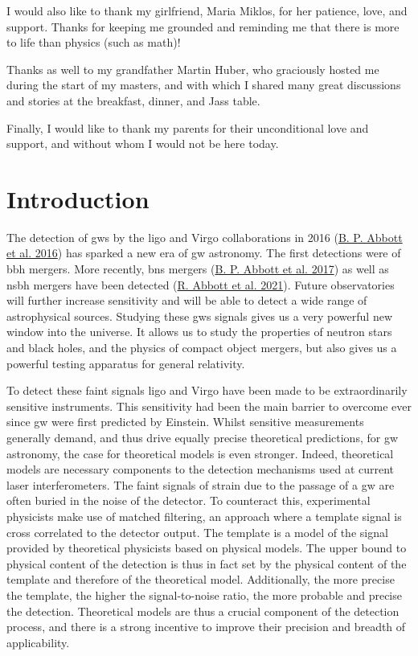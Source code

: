 \documentclass[
  11pt,
  a4paper,
  DIV=11,
  numbers=noendperiod,
  oneside]{scrreprt}
\DeclareRobustCommand{\[}{\begin{equation}}
\DeclareRobustCommand{\]}{\end{equation}}
\begin{document}
I would also like to thank my girlfriend, Maria Miklos, for her
patience, love, and support. Thanks for keeping me grounded and
reminding me that there is more to life than physics (such as math)!

Thanks as well to my grandfather Martin Huber, who graciously hosted me
during the start of my masters, and with which I shared many great
discussions and stories at the breakfast, dinner, and Jass table.

Finally, I would like to thank my parents for their unconditional love
and support, and without whom I would not be here today.


\hypertarget{sec-intro}{%
\chapter{Introduction}\label{sec-intro}}

The detection of \glspl{gw} by the \gls{ligo} and Virgo collaborations
in 2016 (\protect\hyperlink{ref-LIGOScientific:2016aoc}{B. P. Abbott et
al. 2016}) has sparked a new era of \gls{gw} astronomy. The first
detections were of \gls{bbh} mergers. More recently, \gls{bns} mergers
(\protect\hyperlink{ref-LIGOScientific:2017vwq}{B. P. Abbott et al.
2017}) as well as \gls{nsbh} mergers have been detected
(\protect\hyperlink{ref-LIGOScientific:2021qlt}{R. Abbott et al. 2021}).
Future observatories will further increase sensitivity and will be able
to detect a wide range of astrophysical sources. Studying these
\glspl{gw} signals gives us a very powerful new window into the
universe. It allows us to study the properties of neutron stars and
black holes, and the physics of compact object mergers, but also gives
us a powerful testing apparatus for general relativity.

To detect these faint signals \gls{ligo} and Virgo have been made to be
extraordinarily sensitive instruments. This sensitivity had been the
main barrier to overcome ever since \gls{gw} were first predicted by
Einstein. Whilst sensitive measurements generally demand, and thus drive
equally precise theoretical predictions, for \gls{gw} astronomy, the
case for theoretical models is even stronger. Indeed, theoretical models
are necessary components to the detection mechanisms used at current
laser interferometers. The faint signals of strain due to the passage of
a \gls{gw} are often buried in the noise of the detector. To counteract
this, experimental physicists make use of matched filtering, an approach
where a template signal is cross correlated to the detector output. The
template is a model of the signal provided by theoretical physicists
based on physical models. The upper bound to physical content of the
detection is thus in fact set by the physical content of the template
and therefore of the theoretical model. Additionally, the more precise
the template, the higher the signal-to-noise ratio, the more probable
and precise the detection. Theoretical models are thus a crucial
component of the detection process, and there is a strong incentive to
improve their precision and breadth of applicability.
\end{document}
